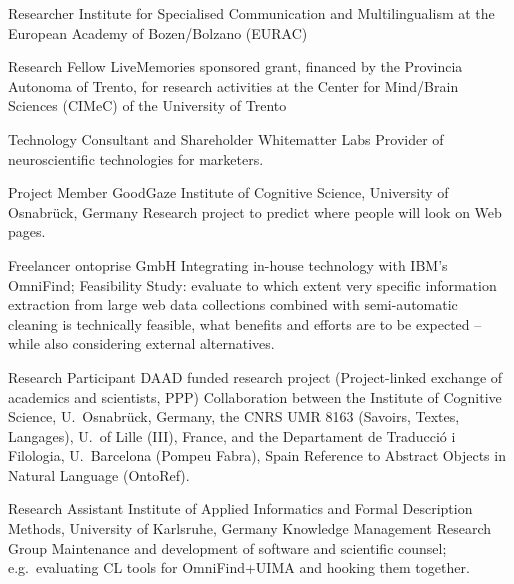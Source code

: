 
        {Researcher}
        {Institute for Specialised Communication and Multilingualism at the
        European Academy of Bozen/Bolzano (EURAC)}
        {}{}{}

        {Research Fellow}
        {LiveMemories sponsored grant, financed by the Provincia Autonoma of
        Trento, for research activities at the Center for Mind/Brain Sciences
        (CIMeC) of the University of Trento}
        {}{}{}

        {Technology Consultant and Shareholder}
        {Whitematter Labs}
        {}
        {}
        {Provider of neuroscientific technologies for marketers.}

        {Project Member}
        {GoodGaze}
        {Institute of Cognitive Science, University of Osnabrück, Germany}
        {}
        {Research project to predict where people will look on Web pages.}

        {Freelancer}
        {ontoprise GmbH}
        {}
        {}
        {Integrating in-house technology with IBM's OmniFind;
        Feasibility Study: evaluate to which extent very specific information
        extraction from large web data collections combined with semi-automatic
        cleaning is technically feasible, what benefits and efforts are to be
        expected -- while also considering external alternatives.}

        {Research Participant}
        {DAAD funded research project (Project-linked exchange of academics and
        scientists, PPP)}
        {Collaboration between the Institute of Cognitive Science,
        U.~Osnabr\"{u}ck, Germany, the CNRS UMR 8163 (Savoirs, Textes,
        Langages), U.~of Lille (III), France, and the Departament de
        Traducci\'{o} i Filologia, U.~Barcelona (Pompeu Fabra), Spain}
        {}
        {Reference to Abstract Objects in Natural Language
        (OntoRef).}

        {Research Assistant}
        {}
        {Institute of Applied Informatics and Formal Description Methods,
        University of Karlsruhe, Germany} 
        {Knowledge Management Research Group}
        {Maintenance and development of software and scientific counsel;
        e.g.~evaluating CL tools for OmniFind+UIMA and hooking them together.}


